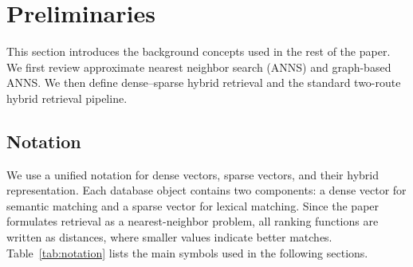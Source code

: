 \section{Preliminaries}
\label{sec:problemDefinition}

This section introduces the background concepts used in the rest of the paper. We first review approximate nearest neighbor search (ANNS) and graph-based ANNS. We then define dense--sparse hybrid retrieval and the standard two-route hybrid retrieval pipeline.

\subsection{Notation}

We use a unified notation for dense vectors, sparse vectors, and their hybrid representation. Each database object contains two components: a dense vector for semantic matching and a sparse vector for lexical matching. Since the paper formulates retrieval as a nearest-neighbor problem, all ranking functions are written as distances, where smaller values indicate better matches. Table~\ref{tab:notation} lists the main symbols used in the following sections.

